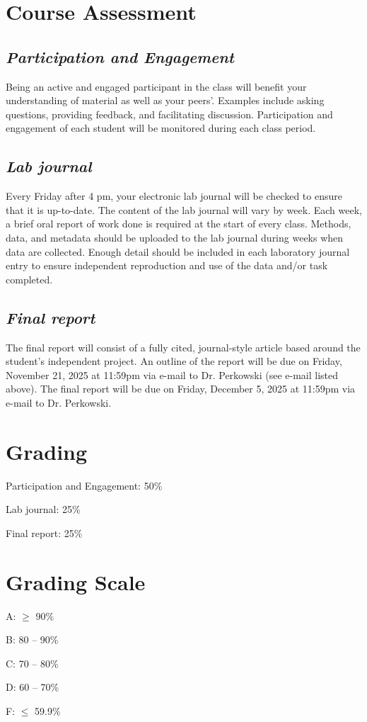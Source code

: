 \documentclass[12pt, notitlepage]{article}   	%
\begin{document}
{\section{Course Assessment}
\subsection{\textit{Participation and Engagement}}
Being an active and engaged participant in the class will benefit your understanding of material as well as your peers'. Examples include asking questions, providing feedback, and facilitating discussion. Participation and engagement of each student will be monitored during each class period.

\subsection{\textit{Lab journal}}
Every Friday after 4 pm, your electronic lab journal will be checked to ensure that it is up-to-date. The content of the lab journal will vary by week. Each week, a brief oral report of work done is required at the start of every class. Methods, data, and metadata should be uploaded to the lab journal during weeks when data are collected. Enough detail should be included in each laboratory journal entry to ensure independent reproduction and use of the data and/or task completed.

\subsection{\textit{Final report}}
The final report will consist of a fully cited, journal-style article based around the student's independent project. An outline of the report will be due on Friday, November 21, 2025 at 11:59pm via e-mail to Dr. Perkowski (see e-mail listed above). The final report will be due on Friday, December 5, 2025 at 11:59pm via e-mail to Dr. Perkowski.\par

\section{Grading}
Participation and Engagement: 50\% \par
Lab journal: 25\% \par
Final report: 25\% \par

\section{Grading Scale}
A: $\geq$ 90\% \par
B: 80 – 90\% \par
C: 70 – 80\% \par
D: 60 – 70\% \par
F: $\leq$ 59.9\% \par

}
\end{document}
